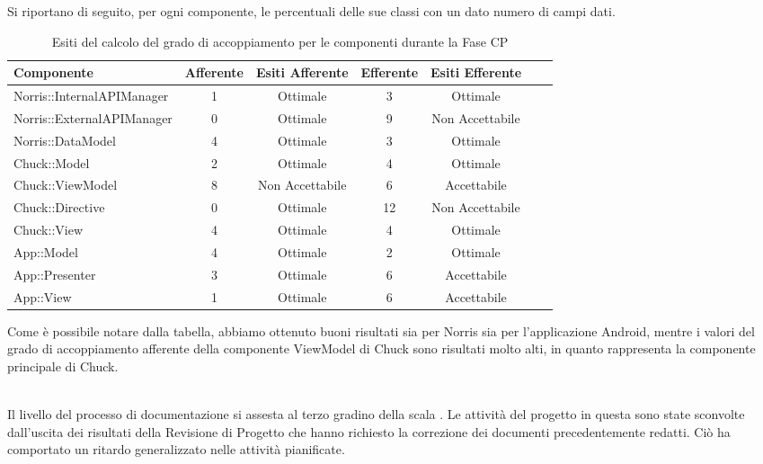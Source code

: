 Si riportano di seguito, per ogni componente, le percentuali delle sue classi con un dato numero di campi dati.
\begin{table}[H]
	\centering
		\begin{tabu}{| l | c | c | c | c | c | c | }
			\hline
			Componente	& Afferente & Esiti Afferente & Efferente & Esiti Efferente 	\\ \hline \hline
			Norris::InternalAPIManager	& 1 & Ottimale & 3 & Ottimale  \\ \hline
			Norris::ExternalAPIManager  & 0 & Ottimale & 9 & Non Accettabile   \\ \hline
			Norris::DataModel  & 4 & Ottimale & 3 & Ottimale   \\ \hline
			Chuck::Model & 2 & Ottimale & 4 & Ottimale   \\ \hline
			Chuck::ViewModel & 8 & Non Accettabile & 6 & Accettabile   \\ \hline
			Chuck::Directive & 0 & Ottimale & 12 & Non Accettabile   \\ \hline
			Chuck::View & 4 & Ottimale & 4 & Ottimale   \\ \hline
			App::Model & 4 & Ottimale & 2 & Ottimale   \\ \hline
			App::Presenter & 3 & Ottimale & 6 & Accettabile   \\ \hline
			App::View & 1 & Ottimale & 6 & Accettabile   \\ \hline
		\end{tabu}
	\caption{Esiti del calcolo del grado di accoppiamento per le componenti durante la Fase CP}
\end{table}
Come è possibile notare dalla tabella, abbiamo ottenuto buoni risultati sia per Norris sia per l'applicazione Android, mentre i valori del grado di accoppiamento afferente della componente ViewModel di Chuck sono risultati molto alti, in quanto rappresenta la componente principale di Chuck.
\\ \\
 

Il livello del processo di documentazione si assesta al terzo gradino della scala .
Le attività del progetto in questa  sono state sconvolte dall'uscita dei risultati della Revisione di Progetto che hanno richiesto la correzione dei documenti precedentemente redatti. Ciò ha comportato un ritardo generalizzato nelle attività pianificate.

